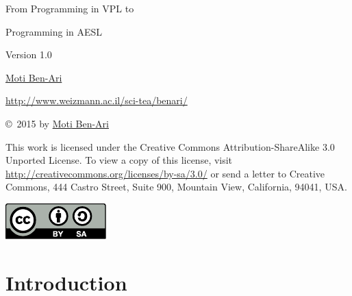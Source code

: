 \documentclass[11pt,a4paper,english]{report}
\begin{document}
\thispagestyle{empty}

\begin{center}
\begin{Huge}
\begin{bfseries}
From Programming in VPL to

\medskip

Programming in AESL
\end{bfseries}
\end{Huge}

\bigskip
\bigskip

\begin{Large}
Version 1.0
\end{Large}

\bigskip\bigskip\bigskip\bigskip\bigskip

\begin{LARGE}
\href{http://www.weizmann.ac.il/sci-tea/benari/}{Moti Ben-Ari}
\end{LARGE}

\begin{Large}
\href{http://www.weizmann.ac.il/sci-tea/benari/}{http://www.weizmann.ac.il/sci-tea/benari/}
\end{Large}

\end{center}

\vfill

\begin{center}
\copyright{}\  2015 by \href{http://www.weizmann.ac.il/sci-tea/benari/}{Moti Ben-Ari}%
\end{center}

This work is licensed under the Creative Commons
Attribution-ShareAlike 3.0 Unported License. To view a copy
of this license, visit
\url{http://creativecommons.org/licenses/by-sa/3.0/}
or send a letter to Creative Commons, 444 Castro Street, Suite 900,
Mountain View, California, 94041, USA.

\begin{center}
\includegraphics[width=.2\textwidth]{by-sa}
\end{center}


\chapter{Introduction}
\thispagestyle{empty}
\setcounter{page}{1}
\end{document}
